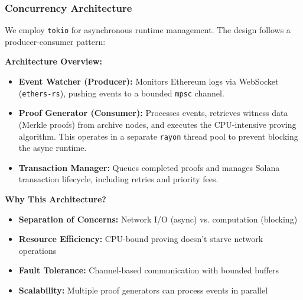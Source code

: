 \documentclass[11pt,a4paper]{article}
\begin{document}
\subsubsection{Concurrency Architecture}

We employ \texttt{tokio} for asynchronous runtime management. The design follows a producer-consumer pattern:

\textbf{Architecture Overview:}
\begin{itemize}
    \item \textbf{Event Watcher (Producer):} Monitors Ethereum logs via WebSocket (\texttt{ethers-rs}), pushing events to a bounded \texttt{mpsc} channel.
    \item \textbf{Proof Generator (Consumer):} Processes events, retrieves witness data (Merkle proofs) from archive nodes, and executes the CPU-intensive proving algorithm. This operates in a separate \texttt{rayon} thread pool to prevent blocking the async runtime.
    \item \textbf{Transaction Manager:} Queues completed proofs and manages Solana transaction lifecycle, including retries and priority fees.
\end{itemize}

\textbf{Why This Architecture?}
\begin{itemize}
    \item \textbf{Separation of Concerns:} Network I/O (async) vs. computation (blocking)
    \item \textbf{Resource Efficiency:} CPU-bound proving doesn't starve network operations
    \item \textbf{Fault Tolerance:} Channel-based communication with bounded buffers
    \item \textbf{Scalability:} Multiple proof generators can process events in parallel
\end{itemize}
\end{document}
